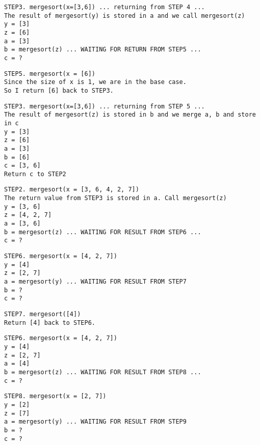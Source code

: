 \begin{Verbatim}[frame=single, fontsize=\footnotesize]
STEP3. mergesort(x=[3,6]) ... returning from STEP 4 ...
The result of mergesort(y) is stored in a and we call mergesort(z) 
y = [3]
z = [6]
a = [3]
b = mergesort(z) ... WAITING FOR RETURN FROM STEP5 ...
c = ?
\end{Verbatim}

\begin{Verbatim}[frame=single, fontsize=\footnotesize]
STEP5. mergesort(x = [6])
Since the size of x is 1, we are in the base case. 
So I return [6] back to STEP3.
\end{Verbatim}

\begin{Verbatim}[frame=single, fontsize=\footnotesize]
STEP3. mergesort(x=[3,6]) ... returning from STEP 5 ...
The result of mergesort(z) is stored in b and we merge a, b and store in c 
y = [3]
z = [6]
a = [3]
b = [6]
c = [3, 6]
Return c to STEP2
\end{Verbatim}

\begin{Verbatim}[frame=single, fontsize=\footnotesize]
STEP2. mergesort(x = [3, 6, 4, 2, 7])
The return value from STEP3 is stored in a. Call mergesort(z)
y = [3, 6]
z = [4, 2, 7]
a = [3, 6]
b = mergesort(z) ... WAITING FOR RESULT FROM STEP6 ...
c = ?
\end{Verbatim}

\begin{Verbatim}[frame=single, fontsize=\footnotesize]
STEP6. mergesort(x = [4, 2, 7])
y = [4]
z = [2, 7]
a = mergesort(y) ... WAITING FOR RESULT FROM STEP7
b = ?
c = ?
\end{Verbatim}

\begin{Verbatim}[frame=single, fontsize=\footnotesize]
STEP7. mergesort([4])
Return [4] back to STEP6.
\end{Verbatim}

\begin{Verbatim}[frame=single, fontsize=\footnotesize]
STEP6. mergesort(x = [4, 2, 7])
y = [4]
z = [2, 7]
a = [4]
b = mergesort(z) ... WAITING FOR RESULT FROM STEP8 ...
c = ? 
\end{Verbatim}

\begin{Verbatim}[frame=single, fontsize=\footnotesize]
STEP8. mergesort(x = [2, 7])
y = [2]
z = [7]
a = mergesort(y) ... WAITING FOR RESULT FROM STEP9
b = ?
c = ?
\end{Verbatim}

